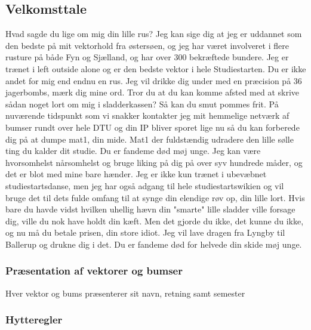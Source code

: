 \documentclass[../../../main.tex]{subfiles}
\begin{document}
\subsection{Velkomsttale}

Hvad sagde du lige om mig din lille rus? Jeg kan sige dig at jeg er uddannet som den bedste på mit vektorhold fra østersøen, og jeg har været involveret i flere rusture på både Fyn og Sjælland, og har over 300 bekræftede bundere. Jeg er trænet i left outside alone og er den bedste vektor i hele Studiestarten. Du er ikke andet for mig end endnu en rus. Jeg vil drikke dig under med en præcision på 36 jagerbombs, mærk dig mine ord. Tror du at du kan komme afsted med at skrive sådan noget lort om mig i sladderkassen? Så kan du smut pommes frit. På nuværende tidspunkt som vi snakker kontakter jeg mit hemmelige netværk af bumser rundt over hele DTU og din IP bliver sporet lige nu så du kan forberede dig på at dumpe mat1, din mide. Mat1 der fuldstændig udradere den lille sølle ting du kalder dit studie. Du er fandeme død møj unge. Jeg kan være hvorsomhelst nårsomhelst og bruge liking på dig på over syv hundrede måder, og det er blot med mine bare hænder. Jeg er ikke kun trænet i ubevæbnet studiestartsdanse, men jeg har også adgang til hele studiestartswikien og vil bruge det til dets fulde omfang til at synge din elendige røv op, din lille lort. Hvis bare du havde vidst hvilken uhellig hævn din "smarte" lille sladder ville forsage dig, ville du nok have holdt din kæft. Men det gjorde du ikke, det kunne du ikke, og nu må du betale prisen, din store idiot. Jeg vil lave dragen fra Lyngby til Ballerup og drukne dig i det. Du er fandeme død for helvede din skide møj unge.

\subsubsection{Præsentation af vektorer og bumser}
Hver vektor og bums præsenterer sit navn, retning samt semester


\subsubsection{Hytteregler}
\end{document}
